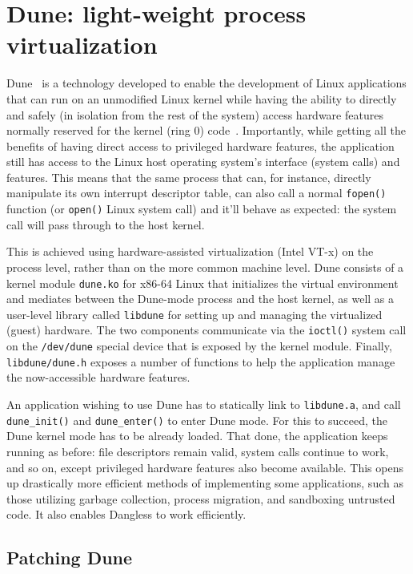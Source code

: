 \section{Dune: light-weight process virtualization}
\label{sec:bg-dune}

Dune~\cite{dune-website} is a technology developed to enable the development of Linux applications that can run on an unmodified Linux kernel while having the ability to directly and safely (in isolation from the rest of the system) access hardware features normally reserved for the kernel (ring 0) code~\cite{dune-paper}. Importantly, while getting all the benefits of having direct access to privileged hardware features, the application still has access to the Linux host operating system's interface (system calls) and features. This means that the same process that can, for instance, directly manipulate its own interrupt descriptor table, can also call a normal \lstinline!fopen()! function (or \lstinline!open()! Linux system call) and it'll behave as expected: the system call will pass through to the host kernel.

This is achieved using hardware-assisted virtualization (Intel VT-x) on the process level, rather than on the more common machine level. Dune consists of a kernel module \texttt{dune.ko} for x86-64 Linux that initializes the virtual environment and mediates between the Dune-mode process and the host kernel, as well as a user-level library called \texttt{libdune} for setting up and managing the virtualized (guest) hardware. The two components communicate via the \lstinline!ioctl()! system call on the \texttt{/dev/dune} special device that is exposed by the kernel module. Finally, \texttt{libdune/dune.h} exposes a number of functions to help the application manage the now-accessible hardware features.

An application wishing to use Dune has to statically link to \texttt{libdune.a}, and call \lstinline!dune_init()! and \lstinline!dune_enter()! to enter Dune mode. For this to succeed, the Dune kernel mode has to be already loaded. That done, the application keeps running as before: file descriptors remain valid, system calls continue to work, and so on, except privileged hardware features also become available. This opens up drastically more efficient methods of implementing some applications, such as those utilizing garbage collection, process migration, and sandboxing untrusted code. It also enables Dangless to work efficiently.

\subsection{Patching Dune}

